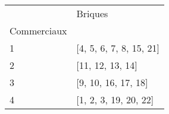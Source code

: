 \documentclass[preview]{standalone}
\begin{document}
    \begin{tabular}{ll}
\toprule
 & Briques \\
Commerciaux &  \\
\midrule
1 & [4, 5, 6, 7, 8, 15, 21] \\
2 & [11, 12, 13, 14] \\
3 & [9, 10, 16, 17, 18] \\
4 & [1, 2, 3, 19, 20, 22] \\
\bottomrule
\end{tabular}

    
\end{document}
